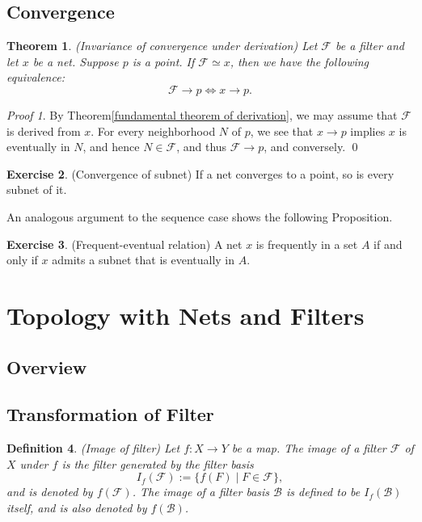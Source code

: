 \documentclass[a4paper,12pt]{article}
\newtheorem{thm}{Theorem}[section]
\newtheorem{dfn}[thm]{Definition}
\theoremstyle{remark}
\newtheorem*{prf}{Proof}
\theoremstyle{definition}
\theoremstyle{definition}
\theoremstyle{definition}
\newtheorem{exe}[thm]{Exercise}
\begin{document}
\subsection{Convergence}

\begin{thm}\label{invariance convergence} (Invariance of convergence under derivation)
	Let \( \mathscr{F} \) be a filter and let \( x \) be a net. Suppose \( p \) is a point. If \( \mathscr{F} \simeq x \), then we have the following equivalence:
	\[
		\mathscr{F} \to p \iff x \to p.
	\]
\end{thm}
\begin{prf}
	By Theorem\ref{fundamental theorem of derivation}, we may assume that \( \mathscr{F} \) is derived from \( x \). For every neighborhood \( N \) of \( p \), we see that \( x \to p \) implies \( x \) is eventually in \( N \), and hence \( N \in \mathscr{F} \), and thus \( \mathscr{F}\to p \), and conversely.
	\qed\end{prf}

\begin{exe} (Convergence of subnet)
	If a net converges to a point, so is every subnet of it.
\end{exe}

An analogous argument to the sequence case shows the following Proposition.
\begin{exe}\label{fe relation} (Frequent-eventual relation)
	A net \( x \) is frequently in a set \( A \) if and only if \( x \) admits a subnet that is eventually in \( A \).
\end{exe}

\section{Topology with Nets and Filters}

\subsection{Overview}

\subsection{Transformation of Filter}

\begin{dfn} (Image of filter)
	Let \( f:X \to Y \) be a map.
	The image of a filter \( \mathscr{F} \) of \( X \) under \( f \) is the filter generated by the filter basis
	\begin{equation*}
		I_f(\mathscr{F}):=\{f(F) \mid F \in \mathscr{F}\},
	\end{equation*}
	and is denoted by \( f(\mathscr{F}) \). The image of a filter basis \( \mathscr{B} \) is defined to be \( I_f(\mathscr{B}) \) itself, and is also denoted by \( f(\mathscr{B}) \).
\end{dfn}
\end{document}
